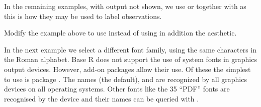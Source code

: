 \documentclass[krantz2]{krantz}\usepackage{knitr}%
\begin{document}
In the remaining examples, with output not shown, we use  or  together with  as this is how they may be used to label observations.

\begin{knitrout}\footnotesize
{}\color{fgcolor}\begin{kframe}
\begin{alltt}
 \hlkwb{<-}
  \hlstd{(} \hlstd{=} \hlopt{:}\hlstd{,}
              \hlstd{=} \hlstd{(}\hlstd{,} \hlstd{),}
              \hlstd{=} \hlstd{(}\hlstd{,} \hlstd{,} \hlstd{,} \hlstd{,} \hlstd{))}

    \hlopt{+}
  \hlstd{(} \hlstd{=} \hlstd{,}  \hlstd{=} \hlstd{,}  \hlstd{=} \hlstd{)} \hlopt{+}
  \hlstd{()}
\end{alltt}
\end{kframe}
\end{knitrout}

\begin{playground}
Modify the example above to use  instead of  using in addition the  aesthetic.
\end{playground}

In the next example we select a different font family, using the same characters in the Roman alphabet.
Base R does not support the use of system fonts in graphics output devices. However, add-on packages allow their use. Of these the simplest to use is package . The names  (the default),  and  are recognized by all graphics devices on all operating systems. Other fonts like the 35 ``PDF'' fonts are recognised by the  device and their names can be queried with .

\begin{knitrout}\footnotesize
{}\color{fgcolor}\begin{kframe}
\begin{alltt}
    \hlopt{+}
  \hlstd{(} \hlstd{=} \hlstd{,}  \hlstd{=} \hlstd{,}  \hlstd{=} \hlstd{,}  \hlstd{=} \hlstd{)} \hlopt{+}
  \hlstd{()}
\end{alltt}
\end{kframe}
\end{knitrout}
\end{document}
